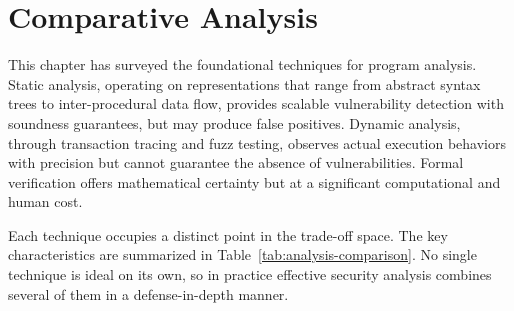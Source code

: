 \section{Comparative Analysis}
\label{sec:comparative-analysis}

This chapter has surveyed the foundational techniques for program analysis. Static analysis, operating on representations that range from abstract syntax trees to inter-procedural data flow, provides scalable vulnerability detection with soundness guarantees, but may produce false positives. Dynamic analysis, through transaction tracing and fuzz testing, observes actual execution behaviors with precision but cannot guarantee the absence of vulnerabilities. Formal verification offers mathematical certainty but at a significant computational and human cost.

\begin{table}[!ht]
\centering
{}
\caption[Code analysis comparison.]{Comparison of static analysis, dynamic analysis, and formal verification.}
\label{tab:analysis-comparison}
\end{table}


Each technique occupies a distinct point in the trade-off space. The key characteristics are summarized in Table~\ref{tab:analysis-comparison}. No single technique is ideal on its own, so in practice effective security analysis combines several of them in a defense-in-depth manner.

